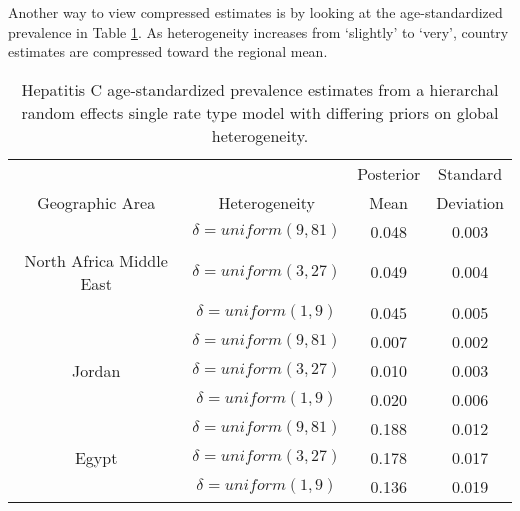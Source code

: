 Another way to view compressed estimates is by looking at the
age-standardized prevalence in Table \ref{tab:app-hepc global rfx}.
As heterogeneity increases from `slightly' to `very', country
estimates are compressed toward the regional mean.

    \begin{table}[h]
        \begin{center}
        \caption{ Hepatitis C age-standardized prevalence estimates from a hierarchal random effects single rate type model with differing priors on global heterogeneity.}
        \label{tab:app-hepc global rfx}
        \begin{tabular}{|c|c|c|c|}
            \hline
                & & Posterior & Standard \\
                Geographic Area & Heterogeneity & Mean & Deviation \\
            \hline
                & $\delta = uniform(9,81)$ & 0.048 & 0.003 \\
                North Africa Middle East & $\delta = uniform(3,27)$ & 0.049 & 0.004 \\
                & $\delta = uniform(1,9)$ & 0.045 & 0.005 \\
            \hline
                & $\delta = uniform(9,81)$ & 0.007 & 0.002 \\
                Jordan & $\delta = uniform(3,27)$ & 0.010 & 0.003 \\
                & $\delta = uniform(1,9)$ & 0.020 & 0.006 \\
            \hline
                & $\delta = uniform(9,81)$ & 0.188 & 0.012 \\
                Egypt & $\delta = uniform(3,27)$ & 0.178 & 0.017 \\
                & $\delta = uniform(1,9)$ & 0.136 & 0.019 \\
            \hline
        \end{tabular}
        \end{center}
    \end{table}
